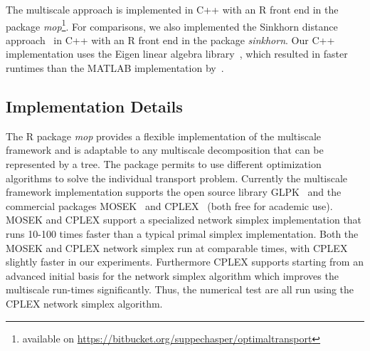 \documentclass[twoside,11pt]{article}
\begin{document}
The multiscale approach is implemented in C++ with an \textsf{R} front end in
the package {\em mop}\footnote{available on
\url{https://bitbucket.org/suppechasper/optimaltransport}}. For comparisons, we also
implemented the Sinkhorn distance approach~\citep{cuturi:nips2013} in C++ with
an \textsf{R} front end in the package {\em
sinkhorn}\footnotemark[\value{footnote}].  Our C++ implementation uses the
Eigen linear algebra library~\citep{eigen}, which resulted in faster runtimes
than the MATLAB implementation by~\citet{cuturi:nips2013}.


\subsection{Implementation Details}
The \textsf{R} package  {\em mop} provides a flexible implementation of the
multiscale framework and is adaptable to any multiscale decomposition that can
be represented by a tree. The package permits to use different optimization
algorithms to solve the individual transport problem.  Currently the multiscale
framework implementation supports the open source library GLPK~\citep{glpk} and
the commercial packages  MOSEK~\citep{mosek} and CPLEX~\citep{cplex} (both free
for academic use). MOSEK and CPLEX support a specialized network simplex
implementation that runs 10-100 times faster than a typical primal simplex
implementation. Both the MOSEK and CPLEX network simplex run at comparable
times, with CPLEX slightly faster in our experiments.  Furthermore CPLEX
supports starting from an advanced initial basis for the network simplex
algorithm which improves the multiscale run-times significantly.  Thus, the
numerical test are all run using the CPLEX network simplex algorithm.
\end{document}

